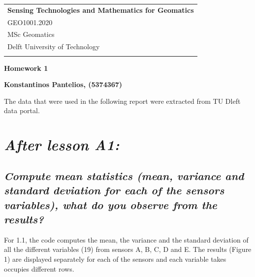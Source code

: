 \documentclass[a4paper,12pt]{article}
\begin{document}
\thispagestyle{empty}
\begin{tabular}{p{15.5cm}}
    {\large \bf Sensing Technologies and Mathematics for Geomatics} \\
    GEO1001.2020 \\ MSc Geomatics \\ Delft University of Technology \\
\hline
\\
\end{tabular}
\vspace*{0.3cm}
\begin{center}
	{\Large \bf Homework 1}
	\vspace{2mm}
	
        
	{\bf Konstantinos Pantelios, (5374367)}
		
\end{center}  
\vspace{0.4cm}
The data that were used in the following report were extracted from TU Dleft data portal. \cite{Maiullari2020}

\section{\it After lesson A1:}
\subsection{\it Compute mean statistics (mean, variance and standard deviation for each of the sensors variables), what do you observe from the results?} %




For 1.1, the code computes the mean, 
the variance and the standard deviation of 
all the different variables (19) from sensors A, B, C, D and E. 
The results (Figure 1) are displayed separately for each of the sensors and each variable takes occupies different rows.
\end{document}

